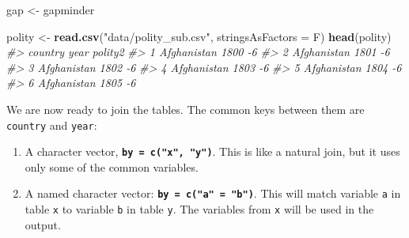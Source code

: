 \documentclass[]{book}
\newenvironment{Shaded}{\begin{snugshade}}{\end{snugshade}}
\newcommand{\KeywordTok}[1]{\textcolor[rgb]{0.13,0.29,0.53}{\textbf{#1}}}
\newcommand{\DataTypeTok}[1]{\textcolor[rgb]{0.13,0.29,0.53}{#1}}
\newcommand{\StringTok}[1]{\textcolor[rgb]{0.31,0.60,0.02}{#1}}
\newcommand{\CommentTok}[1]{\textcolor[rgb]{0.56,0.35,0.01}{\textit{#1}}}
\newcommand{\OperatorTok}[1]{\textcolor[rgb]{0.81,0.36,0.00}{\textbf{#1}}}
\newcommand{\NormalTok}[1]{#1}
\begin{document}
\begin{Shaded}
\begin{Highlighting}[]
\NormalTok{gap <-}\StringTok{ }\NormalTok{gapminder}

\NormalTok{polity <-}\StringTok{ }\KeywordTok{read.csv}\NormalTok{(}\StringTok{"data/polity_sub.csv"}\NormalTok{, }\DataTypeTok{stringsAsFactors =}\NormalTok{ F)}
\KeywordTok{head}\NormalTok{(polity)}
\CommentTok{#>       country year polity2}
\CommentTok{#> 1 Afghanistan 1800      -6}
\CommentTok{#> 2 Afghanistan 1801      -6}
\CommentTok{#> 3 Afghanistan 1802      -6}
\CommentTok{#> 4 Afghanistan 1803      -6}
\CommentTok{#> 5 Afghanistan 1804      -6}
\CommentTok{#> 6 Afghanistan 1805      -6}
\end{Highlighting}
\end{Shaded}

We are now ready to join the tables. The common keys between them are
\texttt{country} and \texttt{year}:

\begin{Shaded}
\end{Shaded}

\begin{enumerate}
\def\labelenumi{\arabic{enumi}.}
\setcounter{enumi}{1}
\item
  A character vector, \textbf{\texttt{by\ =\ c("x",\ "y")}}. This is
  like a natural join, but it uses only some of the common variables.
\item
  A named character vector: \textbf{\texttt{by\ =\ c("a"\ =\ "b")}}.
  This will match variable \texttt{a} in table \texttt{x} to variable
  \texttt{b} in table \texttt{y}. The variables from \texttt{x} will be
  used in the output.
\end{enumerate}
\end{document}
